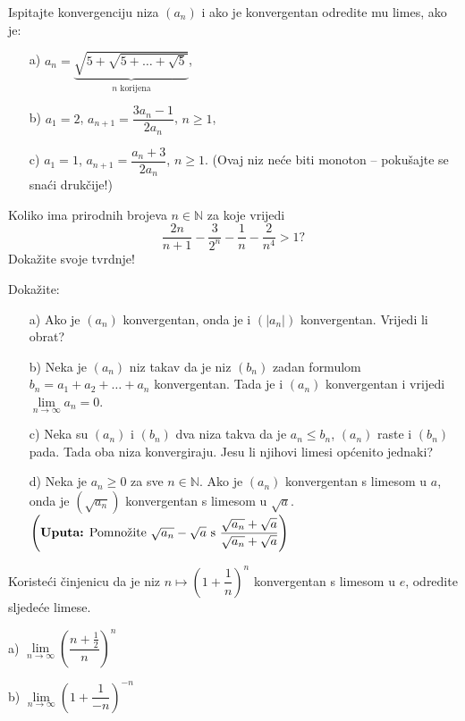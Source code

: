 \begin{exercise}
Ispitajte konvergenciju niza $(a_n)$ i ako je konvergentan odredite mu limes, ako je:
\begin{itemize}
\item[a)] $a_n=\underbrace{\sqrt{5+\sqrt{5+\dots+\sqrt{5}}}}_\text{$n$ korijena}$,
\item[b)] $a_1=2$, $a_{n+1}=\dfrac{3a_n-1}{2a_n}$, $n\geq 1$,
\item[c)] $a_1=1$, $a_{n+1}=\dfrac{a_n+3}{2a_n}$, $n\geq 1$. (Ovaj niz neće biti monoton -- pokušajte se snaći drukčije!)
\end{itemize}
\end{exercise}
\begin{exercise}
Koliko ima prirodnih brojeva $n\in \mathbb{N}$ za koje vrijedi
$$\dfrac{2n}{n+1}-\dfrac{3}{2^n}-\dfrac{1}{n}-\dfrac{2}{n^4}>1?$$
Dokažite svoje tvrdnje!
\end{exercise}
\begin{exercise} Dokažite:
\begin{itemize}
\item[a)] Ako je $(a_n)$ konvergentan, onda je i $(|a_n|)$ konvergentan. Vrijedi li obrat?
\item[b)] Neka je $(a_n)$ niz takav da je niz $(b_n)$ zadan formulom $b_n=a_1+a_2+\dots+a_n$ konvergentan. Tada je i $(a_n)$ konvergentan i vrijedi $\lim\limits_{n\to \infty}{a_n}=0$.
\item[c)] Neka su $(a_n)$ i $(b_n)$ dva niza takva da je $a_n\leq b_n$, $(a_n)$ raste i $(b_n)$ pada. Tada oba niza konvergiraju. Jesu li njihovi limesi općenito jednaki?
\item[d)] Neka je $a_n\geq 0$ za sve $n\in \mathbb{N}$. Ako je $(a_n)$ konvergentan s limesom u $a$, onda je $(\sqrt{a_n})$ konvergentan s limesom u $\sqrt{a}$. $\left(\text{\textbf{Uputa:} Pomnožite }\sqrt{a_n}-\sqrt{a}\text{ s }\dfrac{\sqrt{a_n}+\sqrt{a}}{\sqrt{a_n}+\sqrt{a}}\right)$
\end{itemize}
\end{exercise}
\begin{exercise}
Koristeći činjenicu da je niz $n\mapsto \left(1+\dfrac{1}{n}\right)^n$ konvergentan s limesom u $e$, odredite sljedeće limese.
\begin{AutoMultiColItemize}
\item[a)] $\lim\limits_{n\to \infty}\left(\dfrac{n+\frac{1}{2}}{n}\right)^n$
\item[b)] $\lim\limits_{n\to \infty}\left(1+\dfrac{1}{-n}\right)^{-n}$
\end{AutoMultiColItemize}
\end{exercise}
